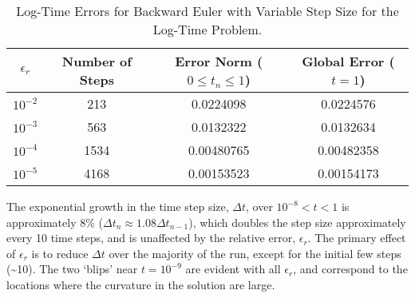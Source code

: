 \begin{table}

\begin{centering}
\caption{Log-Time Errors for Backward Euler with Variable Step Size for the
Log-Time Problem.\label{rythmos:tab:BackwardEuler-Variable-dt-Log-Time}}
\begin{tabular}{|c|c|c|c|}
\hline 
$\epsilon_{r}$ & Number of Steps & Error Norm ($0\leq t_{n}\leq1$) & Global Error ($t=1$)\tabularnewline
\hline 
\hline 
$10^{-2}$ & 213 & 0.0224098 & 0.0224576\tabularnewline
\hline 
$10^{-3}$ & 563 & 0.0132322 & 0.0132634\tabularnewline
\hline 
$10^{-4}$ & 1534 & 0.00480765 & 0.00482358\tabularnewline
\hline 
$10^{-5}$ & 4168 & 0.00153523 & 0.00154173\tabularnewline
\hline 
\end{tabular}
\par\end{centering}
\end{table}

The exponential growth in the time step size, $\Delta t$, over $10^{-8}<t<1$
is approximately 8\% ($\Delta t_{n}\approx1.08\Delta t_{n-1}$), which
doubles the step size approximately every 10 time steps, and is unaffected
by the relative error, $\epsilon_{r}$. The primary effect of $\epsilon_{r}$
is to reduce $\Delta t$ over the majority of the run, except for
the initial few steps (\textasciitilde{}10). The two `blips' near
$t=10^{-9}$ are evident with all $\epsilon_{r}$, and correspond
to the locations where the curvature in the solution are large.
